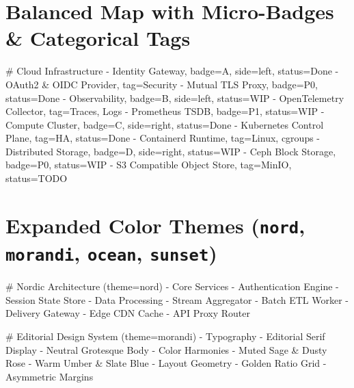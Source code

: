 \documentclass{article}
\begin{document}
\vspace{1cm}

\section*{Balanced Map with Micro-Badges \& Categorical Tags}

\begin{mindchart}[theme=business, layout=balanced, style=underline, line=curve, scale=0.50]
# Cloud Infrastructure
  - Identity Gateway, badge=A, side=left, status=Done
    - OAuth2 \& OIDC Provider, tag=Security
    - Mutual TLS Proxy, badge=P0, status=Done
  - Observability, badge=B, side=left, status=WIP
    - OpenTelemetry Collector, tag={Traces, Logs}
    - Prometheus TSDB, badge=P1, status=WIP
  - Compute Cluster, badge=C, side=right, status=Done
    - Kubernetes Control Plane, tag=HA, status=Done
    - Containerd Runtime, tag={Linux, cgroups}
  - Distributed Storage, badge=D, side=right, status=WIP
    - Ceph Block Storage, badge=P0, status=WIP
    - S3 Compatible Object Store, tag=MinIO, status=TODO
\end{mindchart}

\newpage

\section*{Expanded Color Themes (\texttt{nord}, \texttt{morandi}, \texttt{ocean}, \texttt{sunset})}

\begin{mindchart}[theme=nord, layout=right, style=classic, line=tapered, scale=0.68]
# Nordic Architecture (theme=nord)
  - Core Services
    - Authentication Engine
    - Session State Store
  - Data Processing
    - Stream Aggregator
    - Batch ETL Worker
  - Delivery Gateway
    - Edge CDN Cache
    - API Proxy Router
\end{mindchart}

\vspace{0.8cm}

\begin{mindchart}[theme=morandi, layout=right, style=classic, line=curve, scale=0.68]
# Editorial Design System (theme=morandi)
  - Typography
    - Editorial Serif Display
    - Neutral Grotesque Body
  - Color Harmonies
    - Muted Sage \& Dusty Rose
    - Warm Umber \& Slate Blue
  - Layout Geometry
    - Golden Ratio Grid
    - Asymmetric Margins
\end{mindchart}
\end{document}
